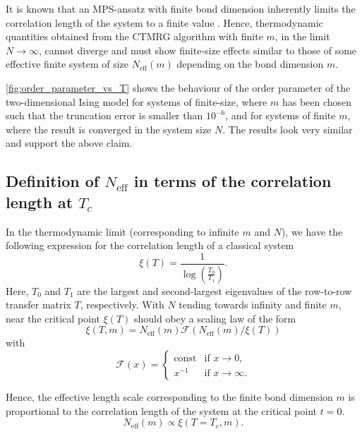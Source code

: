 It is known that an MPS-ansatz with finite bond dimension inherently limits the
correlation length of the system to a finite value \cite{wolf2006quantum}. Hence,
thermodynamic quantities obtained from the CTMRG algorithm with finite $m$, in the limit
$N \to \infty$, cannot diverge and must show finite-size effects similar to those of some
effective finite system of size $N_{\text{eff}}(m)$ depending on the bond dimension $m$.

\autoref{fig:order_parameter_vs_T} shows the behaviour of the order parameter of the
two-dimensional Ising model for systems of finite-size, where $m$ has been chosen such
that the truncation error is smaller than $10^{-6}$, and for systems of finite $m$, where
the result is converged in the system size $N$. The results look very similar and support
the above claim.


\subsection{Definition of $N_{\text{eff}}$ in terms of the correlation length at $T_c$}

In the thermodynamic limit (corresponding to infinite $m$ and $N$), we have the following
expression for the correlation length of a classical system
\cite{baxter1982exactly_correlation_length}
\begin{equation}
  \xi(T) = \frac{1}{\log\left(\frac{T_0}{T_1}\right)}.
\end{equation}
Here, $T_0$ and $T_1$ are the largest and second-largest eigenvalues of the row-to-row
transfer matrix $T$, respectively. With $N$ tending towards infinity and finite $m$, near
the critical point $\xi(T)$ should obey a scaling law of the form
\begin{equation}
  \xi(T, m) = N_{\text{eff}}(m) \mathcal{F}(N_{\text{eff}}(m) / \xi(T))
\end{equation}
with
\begin{equation}
  \mathcal{F}(x) = \begin{cases}
      \text{const} & \text{if } x \to 0, \\
      x^{-1} & \text{if } x \to \infty.
    \end{cases}
\end{equation}

Hence, the effective length scale corresponding to the finite bond dimension $m$ is
proportional to the correlation length of the system at the critical point $t = 0$.
\begin{equation}
  N_{\text{eff}}(m) \propto \xi(T = T_c, m).
\end{equation}

